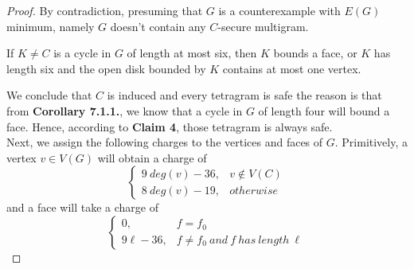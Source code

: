 \begin{proof}
By contradiction, presuming that $G$ is a counterexample with $E(G)$ minimum, namely $G$ doesn't contain any $C$-secure multigram.

\begin{corollary}
If $K \ne C$ is a cycle in $G$ of length at most six, then $K$ bounds a face,
or $K$ has length six and the open disk bounded by $K$ contains at most
one vertex. \cite{dvorak2013threecoloring}
\end{corollary}
We conclude that $C$ is induced and every tetragram is safe the reason is that from \textbf{Corollary 7.1.1.}, we know that a cycle in $G$ of length four will bound a face. Hence, according to \textbf{Claim 4}, those tetragram is always safe.\\ 

Next, we assign the following charges to the vertices and faces of $G$. Primitively, a vertex $v \in V(G)$ will obtain a charge of 
\begin{equation*}
\left\{
    \begin{array}{ll}
    9 \ deg(v) -36, & v \notin V(C)  \\
    8 \ deg(v) - 19, & otherwise
    \end{array}
\right.
\end{equation*}
and a face will take a charge of 
\begin{equation*}
\left\{
    \begin{array}{ll}
    0, &  f = f_0\\
    9\ell -36, & f \neq f_0 \ and \ f \ has \ length \ \ell
    \end{array}
\right.
\end{equation*}


\end{proof}

